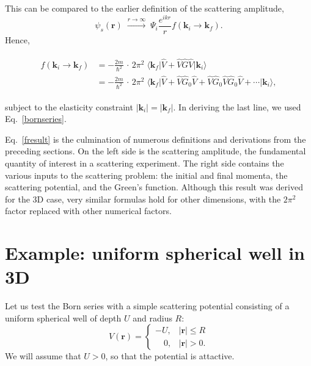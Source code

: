 \documentclass[pra,12pt]{revtex4}
\begin{document}
This can be compared to the earlier definition of the scattering amplitude,
\begin{equation}
  \psi_s(\mathbf{r}) \; \overset{r\rightarrow\infty}{\longrightarrow} \; \Psi_i \frac{e^{ikr}}{r} f(\mathbf{k}_i\rightarrow \mathbf{k}_f ).
\end{equation}
Hence,
\begin{framed}
  \begin{align}
    \begin{aligned}
      f(\mathbf{k}_i \rightarrow \mathbf{k}_f) &= - \frac{2m}{\hbar^2} \,\cdot \, 2\pi^2 \; \big\langle \mathbf{k}_f\big| \hat{V} + \hat{V}\hat{G} \hat{V} \big|\mathbf{k}_i\big\rangle \\
      &= - \frac{2m}{\hbar^2} \,\cdot \, 2\pi^2 \; \big\langle \mathbf{k}_f\big| \hat{V} + \hat{V}\hat{G}_0 \hat{V} + \hat{V} \hat{G}_0 \hat{V} \hat{G}_0\hat{V} + \cdots \big|\mathbf{k}_i\big\rangle,  \end{aligned}
    \label{fresult}
  \end{align}
\end{framed}
\vskip -0.15in
\noindent
subject to the elasticity constraint $|\mathbf{k}_i| =
|\mathbf{k}_f|$.  In deriving the last line, we used
Eq.~\eqref{bornseries}.

Eq.~\eqref{fresult} is the culmination of numerous definitions and
derivations from the preceding sections.  On the left side is the
scattering amplitude, the fundamental quantity of interest in a
scattering experiment.  The right side contains the various inputs to
the scattering problem: the initial and final momenta, the scattering
potential, and the Green's function.  Although this result was derived
for the 3D case, very similar formulas hold for other dimensions, with
the $2\pi^2$ factor replaced with other numerical factors.

\section{Example: uniform spherical well in 3D}

Let us test the Born series with a simple scattering potential
consisting of a uniform spherical well of depth $U$ and radius $R$:
\begin{equation}
  V(\mathbf{r}) = \begin{cases}-U, & |\mathbf{r}| \le R \\ \;\;\;\,0,
    & |\mathbf{r}| > 0. \end{cases}
\end{equation}
We will assume that $U > 0$, so that the potential is attactive.
\end{document}
